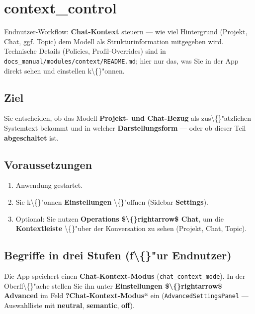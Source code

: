 \section{context\_control}

Endnutzer-Workflow: \textbf{Chat-Kontext} steuern --- wie viel Hintergrund (Projekt, Chat, ggf. Topic) dem Modell als Strukturinformation mitgegeben wird. Technische Details (Policies, Profil-Overrides) sind in \texttt{docs\_manual/modules/context/README.md}; hier nur das, was Sie in der App direkt sehen und einstellen k\textbackslash\{\}"onnen.

\subsection{Ziel}

Sie entscheiden, ob das Modell \textbf{Projekt- und Chat-Bezug} als zus\textbackslash\{\}"atzlichen Systemtext bekommt und in welcher \textbf{Darstellungsform} --- oder ob dieser Teil \textbf{abgeschaltet} ist.

\subsection{Voraussetzungen}

\begin{enumerate}
\item Anwendung gestartet.
\item Sie k\textbackslash\{\}"onnen \textbf{Einstellungen} \textbackslash\{\}"offnen (Sidebar \textbf{Settings}).
\item Optional: Sie nutzen \textbf{Operations \$\textbackslash\{\}rightarrow\$ Chat}, um die \textbf{Kontextleiste} \textbackslash\{\}"uber der Konversation zu sehen (Projekt, Chat, Topic).
\end{enumerate}

\subsection{Begriffe in drei Stufen (f\textbackslash\{\}"ur Endnutzer)}

Die App speichert einen \textbf{Chat-Kontext-Modus} (\texttt{chat\_context\_mode}). In der Oberfl\textbackslash\{\}"ache stellen Sie ihn unter \textbf{Einstellungen \$\textbackslash\{\}rightarrow\$ Advanced} im Feld \textbf{?Chat-Kontext-Modus``} ein (\texttt{AdvancedSettingsPanel} --- Auswahlliste mit \textbf{neutral}, \textbf{semantic}, \textbf{off}).

